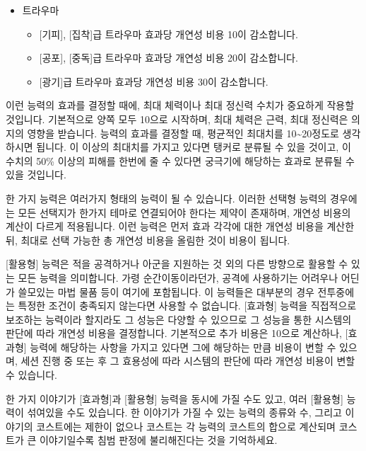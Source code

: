 \documentclass{report}
\begin{document}
\begin{itemize}
		\item 트라우마
		\begin{itemize}
			\item {}[기피], [집착]급 트라우마 효과당 개연성 비용 10이 감소합니다.
			\item {}[공포], [중독]급 트라우마 효과당 개연성 비용 20이 감소합니다.
			\item {}[광기]급 트라우마 효과당 개연성 비용 30이 감소합니다.
		\end{itemize}
	\end{itemize}
	
	이런 능력의 효과를 결정할 때에, 최대 체력이나 최대 정신력 수치가 중요하게 작용할 것입니다. 기본적으로 양쪽 모두 10으로 시작하며, 최대 체력은 근력, 최대 정신력은 의지의 영향을 받습니다. 능력의 효과를 결정할 때, 평균적인 최대치를 10\textasciitilde20정도로 생각하시면 됩니다. 이 이상의 최대치를 가지고 있다면 탱커로 분류될 수 있을 것이고, 이 수치의 50\% 이상의 피해를 한번에 줄 수 있다면 궁극기에 해당하는 효과로 분류될 수 있을 것입니다.
	
	한 가지 능력은 여러가지 형태의 능력이 될 수 있습니다. 이러한 선택형 능력의 경우에는 모든 선택지가 한가지 테마로 연결되어야 한다는 제약이 존재하며, 개연성 비용의 계산이 다르게 적용됩니다. 이런 능력은 먼저 효과 각각에 대한 개연성 비용을 계산한 뒤, 최대로 선택 가능한 총 개연성 비용을 올림한 것이 비용이 됩니다.
	
	[활용형] 능력은 적을 공격하거나 아군을 지원하는 것 외의 다른 방향으로 활용할 수 있는 모든 능력을 의미합니다. 가령 순간이동이라던가, 공격에 사용하기는 어려우나 어딘가 쓸모있는 마법 물품 등이 여기에 포함됩니다. 이 능력들은 대부분의 경우 전투중에는 특정한 조건이 충족되지 않는다면 사용할 수 없습니다. [효과형] 능력을 직접적으로 보조하는 능력이라 할지라도 그 성능은 다양할 수 있으므로 그 성능을 통한 시스템의 판단에 따라 개연성 비용을 결정합니다. 기본적으로 추가 비용은 10으로 계산하나, [효과형] 능력에 해당하는 사항을 가지고 있다면 그에 해당하는 만큼 비용이 변할 수 있으며, 세션 진행 중 또는 후 그 효용성에 따라 시스템의 판단에 따라 개연성 비용이 변할 수 있습니다.
	
	한 가지 이야기가 [효과형]과 [활용형] 능력을 동시에 가질 수도 있고, 여러 [활용형] 능력이 섞여있을 수도 있습니다. 한 이야기가 가질 수 있는 능력의 종류와 수, 그리고 이야기의 코스트에는 제한이 없으나 코스트는 각 능력의 코스트의 합으로 계산되며 코스트가 큰 이야기일수록 침범 판정에 불리해진다는 것을 기억하세요.
	
	\bigskip
	
\end{document}
